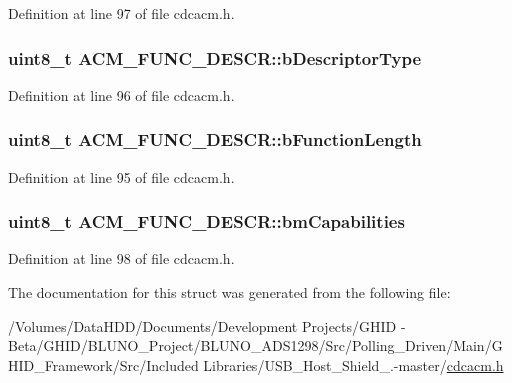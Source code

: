 \-Definition at line 97 of file cdcacm.\-h.

\hypertarget{struct_a_c_m___f_u_n_c___d_e_s_c_r_a4562e71852b142b483b68deaaa360e6a}{
\subsubsection[{b\-Descriptor\-Type}]{\setlength{\rightskip}{0pt plus 5cm}uint8\-\_\-t {\bf \-A\-C\-M\-\_\-\-F\-U\-N\-C\-\_\-\-D\-E\-S\-C\-R\-::b\-Descriptor\-Type}}}\label{struct_a_c_m___f_u_n_c___d_e_s_c_r_a4562e71852b142b483b68deaaa360e6a}


\-Definition at line 96 of file cdcacm.\-h.

\hypertarget{struct_a_c_m___f_u_n_c___d_e_s_c_r_a46c41dcbc0f3fdc37c0cd411b6b3213e}{
\subsubsection[{b\-Function\-Length}]{\setlength{\rightskip}{0pt plus 5cm}uint8\-\_\-t {\bf \-A\-C\-M\-\_\-\-F\-U\-N\-C\-\_\-\-D\-E\-S\-C\-R\-::b\-Function\-Length}}}\label{struct_a_c_m___f_u_n_c___d_e_s_c_r_a46c41dcbc0f3fdc37c0cd411b6b3213e}


\-Definition at line 95 of file cdcacm.\-h.

\hypertarget{struct_a_c_m___f_u_n_c___d_e_s_c_r_a6c54b317cabd68eebd318257ab02abe4}{
\subsubsection[{bm\-Capabilities}]{\setlength{\rightskip}{0pt plus 5cm}uint8\-\_\-t {\bf \-A\-C\-M\-\_\-\-F\-U\-N\-C\-\_\-\-D\-E\-S\-C\-R\-::bm\-Capabilities}}}\label{struct_a_c_m___f_u_n_c___d_e_s_c_r_a6c54b317cabd68eebd318257ab02abe4}


\-Definition at line 98 of file cdcacm.\-h.



\-The documentation for this struct was generated from the following file\-:\begin{DoxyCompactItemize}
\item 
/\-Volumes/\-Data\-H\-D\-D/\-Documents/\-Development Projects/\-G\-H\-I\-D -\/ Beta/\-G\-H\-I\-D/\-B\-L\-U\-N\-O\-\_\-\-Project/\-B\-L\-U\-N\-O\-\_\-\-A\-D\-S1298/\-Src/\-Polling\-\_\-\-Driven/\-Main/\-G\-H\-I\-D\-\_\-\-Framework/\-Src/\-Included Libraries/\-U\-S\-B\-\_\-\-Host\-\_\-\-Shield\-\_.-\/master/\hyperlink{cdcacm_8h}{cdcacm.\-h}\end{DoxyCompactItemize}
